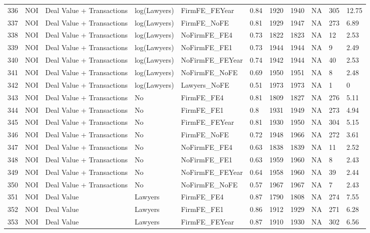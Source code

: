 \begin{table}[ht]
\begin{tabular}{rllllllllll}
  336 & NOI & Deal Value + Transactions & log(Lawyers) & FirmFE\_FEYear & 0.84 & 1920 & 1940 & NA & 305 & 12.75 \\ 
  337 & NOI & Deal Value + Transactions & log(Lawyers) & FirmFE\_NoFE & 0.81 & 1929 & 1947 & NA & 273 & 6.89 \\ 
  338 & NOI & Deal Value + Transactions & log(Lawyers) & NoFirmFE\_FE4 & 0.73 & 1822 & 1823 & NA & 12 & 2.53 \\ 
  339 & NOI & Deal Value + Transactions & log(Lawyers) & NoFirmFE\_FE1 & 0.73 & 1944 & 1944 & NA & 9 & 2.49 \\ 
  340 & NOI & Deal Value + Transactions & log(Lawyers) & NoFirmFE\_FEYear & 0.74 & 1942 & 1944 & NA & 40 & 2.53 \\ 
  341 & NOI & Deal Value + Transactions & log(Lawyers) & NoFirmFE\_NoFE & 0.69 & 1950 & 1951 & NA & 8 & 2.48 \\ 
  342 & NOI & Deal Value + Transactions & log(Lawyers) & Lawyers\_NoFE & 0.51 & 1973 & 1973 & NA & 1 & 0 \\ 
  343 & NOI & Deal Value + Transactions & No & FirmFE\_FE4 & 0.81 & 1809 & 1827 & NA & 276 & 5.11 \\ 
  344 & NOI & Deal Value + Transactions & No & FirmFE\_FE1 & 0.8 & 1931 & 1949 & NA & 273 & 4.94 \\ 
  345 & NOI & Deal Value + Transactions & No & FirmFE\_FEYear & 0.81 & 1930 & 1950 & NA & 304 & 5.15 \\ 
  346 & NOI & Deal Value + Transactions & No & FirmFE\_NoFE & 0.72 & 1948 & 1966 & NA & 272 & 3.61 \\ 
  347 & NOI & Deal Value + Transactions & No & NoFirmFE\_FE4 & 0.63 & 1838 & 1839 & NA & 11 & 2.52 \\ 
  348 & NOI & Deal Value + Transactions & No & NoFirmFE\_FE1 & 0.63 & 1959 & 1960 & NA & 8 & 2.43 \\ 
  349 & NOI & Deal Value + Transactions & No & NoFirmFE\_FEYear & 0.64 & 1958 & 1960 & NA & 39 & 2.44 \\ 
  350 & NOI & Deal Value + Transactions & No & NoFirmFE\_NoFE & 0.57 & 1967 & 1967 & NA & 7 & 2.43 \\ 
  351 & NOI & Deal Value & Lawyers & FirmFE\_FE4 & 0.87 & 1790 & 1808 & NA & 274 & 7.55 \\ 
  352 & NOI & Deal Value & Lawyers & FirmFE\_FE1 & 0.86 & 1912 & 1929 & NA & 271 & 6.28 \\ 
  353 & NOI & Deal Value & Lawyers & FirmFE\_FEYear & 0.87 & 1910 & 1930 & NA & 302 & 6.56 \\ 

\end{tabular}
\end{table}
